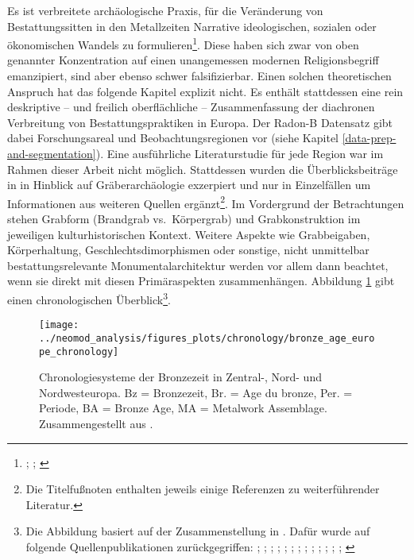 \documentclass[openany,twoside,twocolumn]{book}
\let\rmarkdownfootnote\footnote%
\def\footnote{\protect\rmarkdownfootnote}
\begin{document}
Es ist verbreitete archäologische Praxis, für die Veränderung von
Bestattungssitten in den Metallzeiten Narrative ideologischen, sozialen
oder ökonomischen Wandels zu formulieren\footnote{\textcite{barrett_monumentality_1990};
  \textcite{fokkens_genesis_1997-1};
  \textcite{muller-scheesel_variabilitat_2009}}. Diese haben sich zwar
von oben genannter Konzentration auf einen unangemessen modernen
Religionsbegriff emanzipiert, sind aber ebenso schwer falsifizierbar.
Einen solchen theoretischen Anspruch hat das folgende Kapitel explizit
nicht. Es enthält stattdessen eine rein deskriptive -- und freilich
oberflächliche -- Zusammenfassung der diachronen Verbreitung von
Bestattungspraktiken in Europa. Der Radon-B Datensatz gibt dabei
Forschungsareal und Beobachtungsregionen vor (siehe Kapitel
\ref{data-prep-and-segmentation}). Eine ausführliche Literaturstudie für
jede Region war im Rahmen dieser Arbeit nicht möglich. Stattdessen
wurden die Überblicksbeiträge in \textcite{fokkens_oxford_2013} in
Hinblick auf Gräberarchäologie exzerpiert und nur in Einzelfällen um
Informationen aus weiteren Quellen ergänzt\footnote{Die Titelfußnoten
  enthalten jeweils einige Referenzen zu weiterführender Literatur.}. Im
Vordergrund der Betrachtungen stehen Grabform (Brandgrab vs.~Körpergrab)
und Grabkonstruktion im jeweiligen kulturhistorischen Kontext. Weitere
Aspekte wie Grabbeigaben, Körperhaltung, Geschlechtsdimorphismen oder
sonstige, nicht unmittelbar bestattungsrelevante Monumentalarchitektur
werden vor allem dann beachtet, wenn sie direkt mit diesen
Primäraspekten zusammenhängen. Abbildung \ref{fig:general-chronology}
gibt einen chronologischen Überblick\footnote{Die Abbildung basiert auf
  der Zusammenstellung in \textcite{roberts_old_2013}. Dafür wurde auf
  folgende Quellenpublikationen zurückgegriffen:
  \textcite{arnoldussen_bronze_2008}; \textcite{bourgeois_lage_2005};
  \textcite{burgess_bronze_1974}; \textcite{burgess_age_1980};
  \textcite{brindley_dating_2007}; \textcite{eogan_accomplished_1994};
  \textcite{gerloff_reineckes_2007}; \textcite{gerloff_atlantic_2010};
  \textcite{de_laet_belgique_1982};
  \textcite{lanting_14c-chronologie_2001};
  \textcite{louwe_kooijmanns_prehistory_2005};
  \textcite{needham_chronology_1996};
  \textcite{needham_independent_1997}; \textcite{needham_first_2010}}.

\begin{landscape}
\begin{figure}
\texttt{[image: ../neomod\_analysis/figures\_plots/chronology/bronze\_age\_europe\_chronology]} \caption[Chronologiesysteme der Bronzezeit in Zentral-, Nord- und Nordwesteuropa]{Chronologiesysteme der Bronzezeit in Zentral-, Nord- und Nordwesteuropa. Bz = Bronzezeit, Br. = Age du bronze, Per. = Periode, BA = Bronze Age, MA = Metalwork Assemblage. Zusammengestellt aus \textcite{roberts_old_2013}.}\label{fig:general-chronology}
\end{figure}
\end{landscape}
\end{document}
